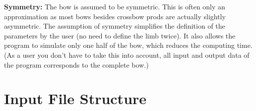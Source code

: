 \documentclass[12pt]{article}
\begin{document}
\textbf{Symmetry:} The bow is assumed to be symmetric.
This is often only an approximation as most bows besides crossbow prods are actually slightly asymmetric.
The assumption of symmetry simplifies the definition of the parameters by the user (no need to define the limb twice).
It also allows the program to simulate only one half of the bow, which reduces the computing time.
(As a user you don't have to take this into account, all input and output data of the program corresponds to the complete bow.)

\appendix

\newpage
\section{Input File Structure}
\label{sec:input-structure}

\newcommand{\tablespace}{\rule{0pt}{3ex}}
\end{document}

